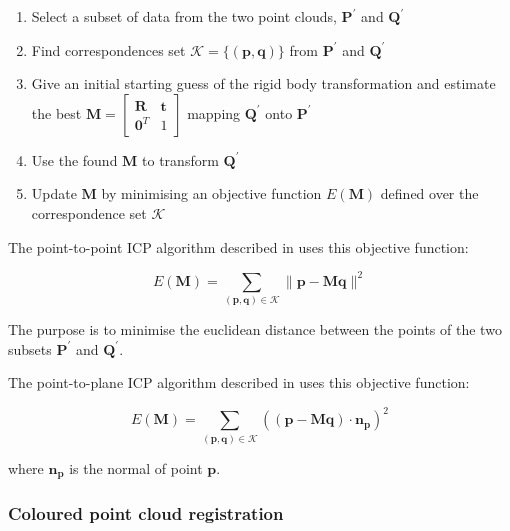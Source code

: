 \begin{enumerate}
    \item Select a subset of data from the two point clouds, $\mathbf{P}^{\prime}$ and $\mathbf{Q}^{\prime}$
    \item Find correspondences set $\mathcal{K} = \{(\mathbf{p}, \mathbf{q})\}$ from $\mathbf{P}^{\prime}$ and $\mathbf{Q}^{\prime}$
    \item Give an initial starting guess of the rigid body transformation and estimate the best $\mathbf{M}=\left[\begin{array}{ll}{\mathbf{R}} & {\mathbf{t}} \\ {\mathbf{0}^{T}} & {1}\end{array}\right]$ mapping $\mathbf{Q}^{\prime}$ onto $\mathbf{P}^{\prime}$
    \item Use the found $\mathbf{M}$ to transform $\mathbf{Q}^{\prime}$
    \item Update $\mathbf{M}$ by minimising an objective function $E(\mathbf{M})$ defined over the correspondence set $\mathcal{K}$
\end{enumerate}



The point-to-point ICP algorithm described in \cite{besl_method_1992} uses this objective function:

\begin{equation}
\label{equation:point-to-point}
E(\mathbf{M})=\sum_{(\mathbf{p}, \mathbf{q}) \in \mathcal{K}}\|\mathbf{p}-\mathbf{M} \mathbf{q}\|^{2}
\end{equation}

The purpose is to minimise the euclidean distance between the points of the two subsets $\mathbf{P}^{\prime}$ and $\mathbf{Q}^{\prime}$.



The point-to-plane ICP algorithm described in \cite{chen_object_1992} uses this objective function:

\begin{equation}
\label{equation:point-to-plane}
E(\mathbf{M})=\sum_{(\mathbf{p}, \mathbf{q}) \in \mathcal{K}}\left((\mathbf{p}-\mathbf{M} \mathbf{q}) \cdot \mathbf{n}_{\mathbf{p}}\right)^{2}
\end{equation}

where $\mathbf{n}_{\mathbf{p}}$ is the normal of point $\mathbf{p}$.

\subsubsection{Coloured point cloud registration}
\label{section:Coloured point cloud registration}

